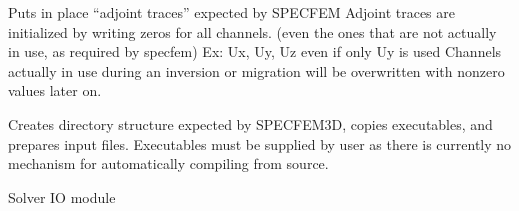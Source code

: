 \documentclass[letterpaper,10pt,english]{sphinxmanual}
\begin{document}
\begin{fulllineitems}

\begin{fulllineitems}
\label{\detokenize{ref/seisflows.solver:seisflows.solver.base.base.import_traces}}
\end{fulllineitems}


\begin{fulllineitems}
\label{\detokenize{ref/seisflows.solver:seisflows.solver.base.base.initialize_adjoint_traces}}
Puts in place “adjoint traces” expected by SPECFEM
Adjoint traces are initialized by writing zeros for all channels.
(even the ones that are not actually in use, as required by
specfem) Ex: Ux, Uy, Uz even if only Uy is used
Channels actually in use during an inversion or migration will be
overwritten with nonzero values later on.

\end{fulllineitems}


\begin{fulllineitems}
\label{\detokenize{ref/seisflows.solver:seisflows.solver.base.base.initialize_solver_directories}}
Creates directory structure expected by SPECFEM3D, copies
executables, and prepares input files. Executables must be supplied
by user as there is currently no mechanism for automatically
compiling from source.

\end{fulllineitems}


\begin{fulllineitems}
\label{\detokenize{ref/seisflows.solver:seisflows.solver.base.base.io}}
Solver IO module


\end{fulllineitems}
\end{fulllineitems}
\end{document}
